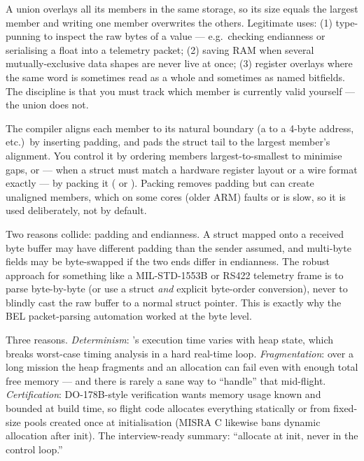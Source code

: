 A union overlays all its members in the same storage, so its size equals the
largest member and writing one member overwrites the others. Legitimate uses:
(1) type-punning to inspect the raw bytes of a value --- e.g.\ checking
endianness or serialising a float into a telemetry packet; (2) saving RAM
when several mutually-exclusive data shapes are never live at once;
(3) register overlays where the same word is sometimes read as a whole and
sometimes as named bitfields. The discipline is that you must track which
member is currently valid yourself --- the union does not.

The compiler aligns each member to its natural boundary (a 
to a 4-byte address, etc.)\ by inserting padding, and pads the struct tail to
the largest member's alignment. You control it by ordering members
largest-to-smallest to minimise gaps, or --- when a struct must match a
hardware register layout or a wire format exactly --- by packing it
( or ). Packing removes
padding but can create unaligned members, which on some cores (older ARM)
faults or is slow, so it is used deliberately, not by default.

Two reasons collide: padding and endianness. A struct mapped onto a received
byte buffer may have different padding than the sender assumed, and
multi-byte fields may be byte-swapped if the two ends differ in endianness.
The robust approach for something like a MIL-STD-1553B or RS422 telemetry
frame is to parse byte-by-byte (or use a  struct \emph{and}
explicit byte-order conversion), never to blindly cast the raw buffer to a
normal struct pointer. This is exactly why the BEL packet-parsing automation
worked at the byte level.

Three reasons. \emph{Determinism}: 's execution time varies with
heap state, which breaks worst-case timing analysis in a hard real-time loop.
\emph{Fragmentation}: over a long mission the heap fragments and an
allocation can fail even with enough total free memory --- and there is
rarely a sane way to ``handle'' that mid-flight. \emph{Certification}:
DO-178B-style verification wants memory usage known and bounded at build
time, so flight code allocates everything statically or from fixed-size
pools created once at initialisation (MISRA C likewise bans dynamic
allocation after init). The interview-ready summary: ``allocate at init,
never in the control loop.''

